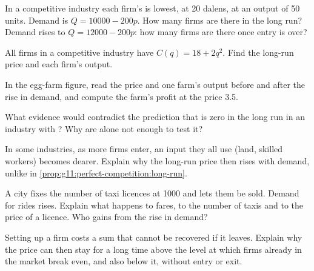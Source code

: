 \begin{exercise}[$\star\star$]\label{exo:g11:perfect-competition:9}
In a competitive industry each firm's  is lowest, at 20 dalens, at an output of 50 units. Demand is $Q = 10000 - 200p$. How many firms are there
in the long run? Demand rises to $Q = 12000 - 200p$: how many firms are there once entry is over?
\end{exercise}

\begin{exercise}[$\star\star$]\label{exo:g11:perfect-competition:10}
All firms in a competitive industry have $C(q) = 18 + 2q^2$. Find the long-run price and each firm's output.
\end{exercise}

\begin{exercise}[$\star\star$]\label{exo:g11:perfect-competition:11}
In the egg-farm figure, read the price and one farm's output before and after the rise in demand, and compute the farm's profit at the price 3.5.
\end{exercise}

\begin{exercise}[$\star\star\star$]\label{exo:g11:perfect-competition:12}
What evidence would contradict the prediction that  is zero in the long run in an industry with ? Why are  alone not
enough to test it?
\end{exercise}

\begin{exercise}[$\star\star\star$]\label{exo:g11:perfect-competition:13}
In some industries, as more firms enter, an input they all use (land, skilled workers) becomes dearer. Explain why the long-run price then rises with demand, unlike
in \cref{prop:g11:perfect-competition:long-run}.
\end{exercise}

\begin{exercise}[$\star\star\star$]\label{exo:g11:perfect-competition:14}
A city fixes the number of taxi licences at 1000 and lets them be sold. Demand for rides rises. Explain what happens to fares, to the number of taxis and to the price
of a licence. Who gains from the rise in demand?
\end{exercise}

\begin{exercise}[$\star\star\star$]\label{exo:g11:perfect-competition:15}
Setting up a firm costs a sum that cannot be recovered if it leaves. Explain why the price can then stay for a long time above the level at which firms already in
the market break even, and also below it, without entry or exit.
\end{exercise}

